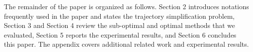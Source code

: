 The remainder of the paper is organized as follows.
Section 2 introduces notations frequently used in the paper and states the trajectory simplification problem,
Section 3 and Section 4 review the sub-optimal and optimal \lsa methods that we evaluated,
Section 5 reports the experimental results, and
Section 6 concludes this paper.
The appendix covers additional related work and experimental results.






